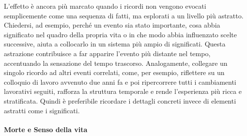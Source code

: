 \documentclass[12pt]{book} %
\begin{document}
\begin{itemize}
L’effetto è ancora più marcato quando i ricordi non vengono evocati semplicemente come una sequenza di fatti, ma esplorati a un livello più astratto. Chiedersi, ad esempio, perché un evento sia stato importante, cosa abbia significato nel quadro della propria vita o in che modo abbia influenzato scelte successive, aiuta a collocarlo in un sistema più ampio di significati. Questa astrazione contribuisce a far apparire l’evento più distante nel tempo, accentuando la sensazione del tempo trascorso. Analogamente, collegare un singolo ricordo ad altri eventi correlati, come, per esempio, riflettere su un colloquio di lavoro avvenuto due anni fa e poi ripercorrere tutti i cambiamenti lavorativi seguiti, rafforza la struttura temporale e rende l’esperienza più ricca e stratificata. Quindi è preferibile ricordare i dettagli concreti invece di elementi astratti come i significati.
\end{itemize}

\paragraph{Morte e Senso della vita}
\end{document}
